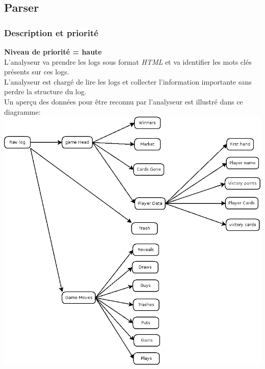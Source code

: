\documentclass{scrreprt}
\begin{document}
\subsection{Parser}

\subsubsection{Description et priorité}
\textbf{Niveau de priorité = haute}\\
L'analyseur va prendre les logs sous format \textit{HTML} et va identifier les mots clés présents sur ces logs.\\
L'analyseur est chargé de lire les logs et collecter l'information importante sans perdre la structure du log.\\
Un aperçu des données pour être reconnu par l'analyseur est illustré dans ce diagramme:\\
\includegraphics[scale=0.35,keepaspectratio]{diaRessources/UseCaseParser}
\end{document}
